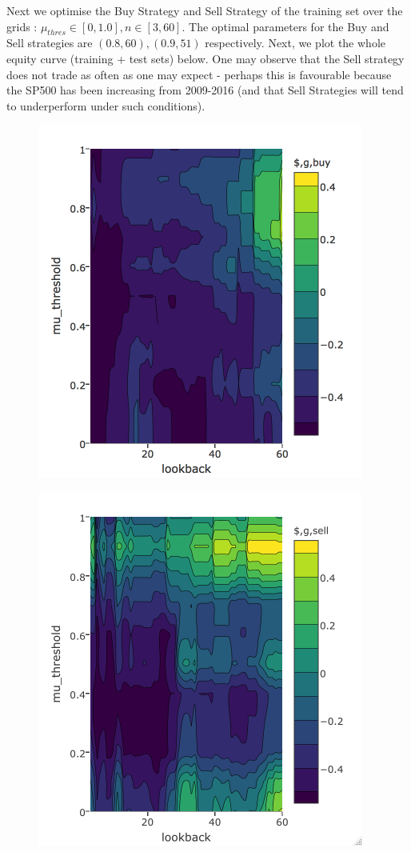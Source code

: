 \documentclass[12pt]{article}
\theoremstyle{definition}
\begin{document}
Next we optimise the Buy Strategy and Sell Strategy of the training set over the grids : $\mu_{thres} \in [0,1.0],n \in [3,60]$. The optimal parameters for the Buy and Sell strategies are $(0.8,60),(0.9,51)$ respectively. Next, we plot the whole equity curve (training + test sets) below. One may observe that the Sell strategy does not trade as often as one may expect - perhaps this is favourable because the SP500 has been increasing from 2009-2016 (and that Sell Strategies will tend to underperform under such conditions).
\begin{figure}[H]
\centering
\begin{minipage}{0.45\textwidth}
\centering
\includegraphics[scale=0.4]{contour1}
  \label{fig:c1}
\end{minipage}
\begin{minipage}{0.45\textwidth}
\centering
\includegraphics[scale=0.4]{contour2}
  \label{fig:c2}
\end{minipage}
\end{figure}
\end{document}
